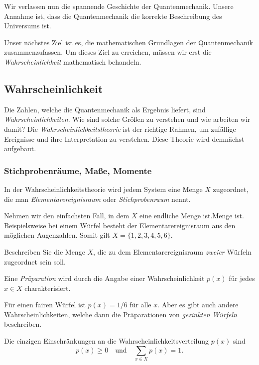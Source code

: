 Wir verlassen nun die spannende Geschichte der Quantenmechanik. Unsere Annahme ist, dass die Quantenmechanik die korrekte Beschreibung des Universums ist.

Unser nächstes Ziel ist es, die mathematischen Grundlagen der Quantenmechanik zusammenzufassen. Um dieses Ziel zu erreichen, müssen wir erst die \emph{Wahrscheinlichkeit} mathematisch behandeln. 

\subsection{Wahrscheinlichkeit}
Die Zahlen, welche die Quantenmechanik als Ergebnis liefert, sind \emph{Wahrscheinlichkeiten}. Wie sind solche Größen zu verstehen und wie arbeiten wir damit? Die \emph{Wahrscheinlichkeitstheorie} ist der richtige Rahmen, um zufällige Ereignisse und ihre Interpretation zu verstehen. Diese Theorie wird demnächst aufgebaut. 


\subsubsection{Stichprobenräume, Maße, Momente}
In der Wahrscheinlichkeitstheorie wird jedem System eine Menge $X$ zugeordnet, die man \emph{Elementarereignisraum} oder \emph{Stichprobenraum} nennt. 

\begin{beispiel}
	Nehmen wir den einfachsten Fall, in dem $X$ eine endliche Menge ist.Menge ist. Beispielsweise bei einem Würfel besteht der Elementarereignisraum aus den möglichen Augenzahlen. Somit gilt $X = \{1, 2, 3, 4, 5, 6\}$.
\end{beispiel}

\begin{übung}
	Beschreiben Sie die Menge $X$, die zu dem Elementarereignisraum \emph{zweier} Würfeln zugeordnet sein soll.  
\end{übung}

Eine \emph{Präparation} wird durch die Angabe einer Wahrscheinlichkeit $p(x)$ für jedes $x\in X$ charakterisiert. 

\begin{beispiel}
	Für einen fairen Würfel ist $p(x) = 1/6$ für alle $x$. Aber es gibt auch andere Wahrscheinlichkeiten, welche dann die Präparationen von \emph{gezinkten Würfeln} beschreiben.
\end{beispiel}

Die einzigen Einschränkungen an die Wahrscheinlichkeitsverteilung $p(x)$ sind
\begin{equation}
	p(x) \ge 0 \quad \text{und}\quad \sum_{x\in X} p(x)  = 1.
\end{equation}

